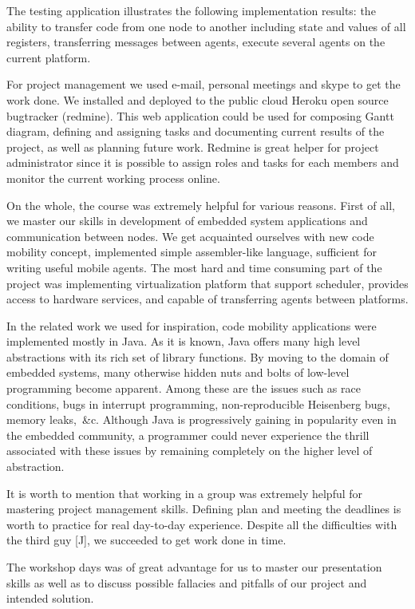\documentclass{scrreprt}
\begin{document}
The testing application illustrates the following implementation results: the  ability to transfer code from
one node to another including state and values of all registers,
transferring messages between agents, execute several agents on the current platform.


For project management we used e-mail, personal meetings and skype to get the work done.
We installed and deployed to the public cloud Heroku
open source bugtracker (redmine). This web application could be used for composing Gantt diagram,
defining and assigning tasks and documenting current results of the project, as well as
planning future work.
Redmine is great helper for project administrator since it is possible to assign 
roles and tasks for each members and monitor the current working process online.


On the whole, the course was extremely helpful for various reasons.
First of all, we master our skills in development of embedded system applications and 
communication between nodes.
We get acquainted ourselves with new code mobility concept, implemented simple
assembler-like language, sufficient for writing useful mobile agents.
The most hard and time consuming part of the project was implementing
virtualization platform that support scheduler, provides access to hardware services,
and capable of transferring agents between platforms.

In the related work we used for inspiration, code mobility applications were implemented mostly in Java. As it is known,
Java offers many high level abstractions with its rich set of library functions. By moving to the domain of embedded systems, 
many otherwise hidden nuts and bolts of low-level programming become apparent. 
Among these are the issues such as race conditions, bugs in interrupt programming, non-reproducible Heisenberg bugs, memory leaks,~\&c.
Although Java is progressively gaining in popularity even in the embedded community, a programmer could never experience the thrill associated
with these issues by remaining completely on the higher level of abstraction.

It is worth to mention that working in a group was extremely helpful for mastering project
management skills. Defining plan and meeting the deadlines is worth to practice 
for real day-to-day experience. Despite all the difficulties with the third guy [J],
we succeeded to get work done in time.


The workshop days was of great advantage for us to master our presentation skills as well as
to discuss possible fallacies and pitfalls of our project and intended solution.
\end{document}
